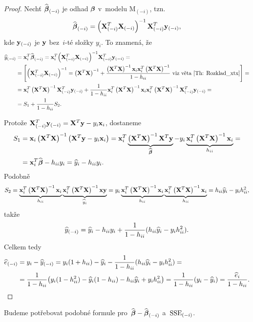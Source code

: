 \begin{proof}
	
	Nechť $\wbetab_{(-i)}$ je odhad $\betab$ v~modelu M$_{(-i)}$, tzn.
	 $$
	\wbetab_{(-i)} = \left(\X_{(-i)}^T \X_{(-i)} \right)^{-1} \X_{(-i)}^T \y_{(-i)},
	 $$
	kde $\y_{(-i)}$ je $\y$ bez~$i$-té složky $y_i$. To znamená, že
	\begin{align*}
	\hy_{(-i)} & = \x_i^T \wbetab_{(-i)} = \x_i^T \inv{\left(\X_{(-i)}^T \X_{(-i)} \right)} \X_{(-i)}^T \y_{(-i)} = \\
	 & = \left[\left(\X_{(-i)}^T \X_{(-i)} \right)^{-1} = \xtx + \frac{\xtx \x_i \x_i^T \xtx}{1 - \hii} \text{ viz věta \ref{Th: Rozklad_xtx}} \right] = \\
	 & = \x_i^T \xtx \X_{(-i)}^T \y_{(-i)} + \frac{1}{1 - \hii} \x_i^T \xtx \x_i \x_i^T \xtx \X_{(-i)}^T \y_{(-i)} = \\
	 & = S_1 + \frac{1}{1-\hii} S_2.
	\end{align*}
	
	Protože $\X_{(-i)}^T \y_{(-i)} = \X^T \y - y_i \x_i$, dostaneme
	\begin{align*}
	S_1 & = \x_i \xtx \left(\X^T \y - y_i \x_i \right) = \x_i^T \underbrace{\xtx \X^T \y}_{\wbetab} - y_i \underbrace{\x_i^T \xtx \x_i}_{\hii} = \\
	& = \x_i^T \wbetab - \hii y_i = \hy_i - \hii y_i.
	\end{align*}
	Podobně	
	 $$ S_2 = \underbrace{\x_i^T \xtx \x_i}_{h_{ii}}\underbrace{\x_i^T\xtx \x\y}_{\hyi} = y_i\underbrace{\x_i^T\xtx \x_i}_{h_{ii}}\underbrace{\x_i^T\xtx \x_i}_{h_{ii}} = h_{ii}\hyi-y_ih_{ii}^2, $$
	takže
	 $$ \hy_{(-i)} = \hyi-h_{ii}y_i+\frac{1}{1-h_{ii}}(h_{ii}\hyi-y_ih_{ii}^2). $$
	Celkem tedy
	\begin{align*}
	\he_{(-i)} & = y_i-\hy_{(-i)} = y_i(1+h_{ii})-\hyi-\frac{1}{1-h_{ii}}(h_{ii}\hyi-y_ih_{ii}^2) = \\
	& = \frac{1}{1-h_{ii}}\big(y_i(1-h_{ii}^2)-\hyi(1-h_{ii})-h_{ii}\hyi+y_ih_{ii}^2\big) = \frac{1}{1-h_{ii}}(y_i-\hyi) = \frac{\hei}{1-h_{ii}}.
	\end{align*}
\end{proof}

\renewcommand{\mini}[1]{#1_{(-i)}}
Budeme potřebovat podobné formule pro~$\wbetab-\wbetab_{(-i)}$ a~$\mini{\SSE}$.

